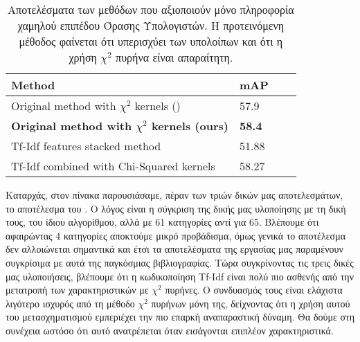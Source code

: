 \documentclass[11pt,a4paper,english,greek,twoside]{../Thesis}
\begin{document}
\begin{table}[H]
	\centering
    \begin{tabular}{| l | l | l | l |}
    \hline
    \textbf{Method} & \textbf{mAP} \\ \hline
    Original method with $\chi^2$ kernels (\cite{rohrbach_2012}) & 57.9 \\ \hline
    \textbf{Original method with $\chi^2$ kernels (ours)} & \textbf{58.4} \\ \hline
    Tf-Idf features stacked method & 51.88 \\ \hline
    Tf-Idf combined with Chi-Squared kernels & 58.27 \\
    \hline
    \end{tabular}
	\label{tab:LLVSResults}
	\caption{Αποτελέσματα των μεθόδων που αξιοποιούν μόνο πληροφορία χαμηλού επιπέδου Όρασης Υπολογιστών. Η προτεινόμενη μέθοδος φαίνεται ότι υπερισχύει των υπολοίπων και ότι η χρήση $\chi^2$ πυρήνα είναι απαραίτητη.}
\end{table}

\par Καταρχάς, στον πίνακα παρουσιάσαμε, πέραν των τριών δικών μας αποτελεσμάτων, το αποτέλεσμα του \cite{rohrbach_2012}. Ο λόγος είναι η σύγκριση της δικής μας υλοποίησης με τη δική τους, του ίδιου αλγορίθμου, αλλά με 61 κατηγορίες αντί για 65. Βλέπουμε ότι αφαιρώντας 4 κατηγορίες αποκτούμε μικρό προβάδισμα, όμως γενικά το αποτέλεσμα δεν αλλοιώνεται σημαντικά και έτσι τα αποτελέσματα της εργασίας μας παραμένουν συγκρίσιμα με αυτά της παγκόσμιας βιβλιογραφίας. Τώρα συγκρίνοντας τις τρεις δικές μας υλοποιήσεις, βλέπουμε ότι η κωδικοποίηση Tf-Idf είναι πολύ πιο ασθενής από την μετατροπή των χαρακτηριστικών με $\chi^2$ πυρήνες. Ο συνδυασμός τους είναι ελάχιστα λιγότερο ισχυρός από τη μέθοδο $\chi^2$ πυρήνων μόνη της, δείχνοντας ότι η χρήση αυτού του μετασχηματισμού εμπεριέχει την πιο επαρκή αναπαραστική δύναμη. Θα δούμε στη συνέχεια ωστόσο ότι αυτό ανατρέπεται όταν εισάγονται επιπλέον χαρακτηριστικά.
\end{document}
